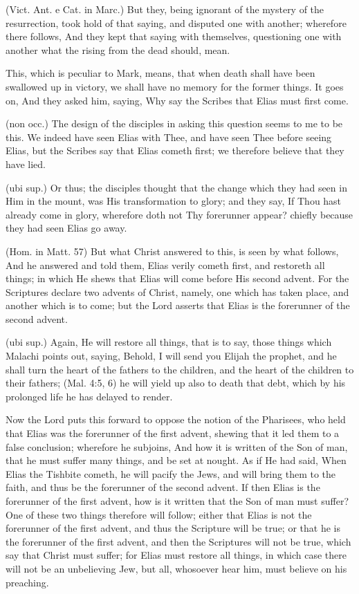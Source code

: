  (Vict. Ant. e Cat. in Marc.) But they, being ignorant of the mystery of the resurrection, took hold of that saying, and disputed one with another; wherefore there follows, And they kept that saying with themselves, questioning one with another what the rising from the dead should, mean.

 This, which is peculiar to Mark, means, that when death shall have been swallowed up in victory, we shall have no memory for the former things. It goes on, And they asked him, saying, Why say the Scribes that Elias must first come.

 (non occ.) The design of the disciples in asking this question seems to me to be this. We indeed have seen Elias with Thee, and have seen Thee before seeing Elias, but the Scribes say that Elias cometh first; we therefore believe that they have lied.

 (ubi sup.) Or thus; the disciples thought that the change which they had seen in Him in the mount, was His transformation to glory; and they say, If Thou hast already come in glory, wherefore doth not Thy forerunner appear? chiefly because they had seen Elias go away.

 (Hom. in Matt. 57) But what Christ answered to this, is seen by what follows, And he answered and told them, Elias verily cometh first, and restoreth all things; in which He shews that Elias will come before His second advent. For the Scriptures declare two advents of Christ, namely, one which has taken place, and another which is to come; but the Lord asserts that Elias is the forerunner of the second advent.

 (ubi sup.) Again, He will restore all things, that is to say, those things which Malachi points out, saying, Behold, I will send you Elijah the prophet, and he shall turn the heart of the fathers to the children, and the heart of the children to their fathers; (Mal. 4:5, 6) he will yield up also to death that debt, which by his prolonged life he has delayed to render.

 Now the Lord puts this forward to oppose the notion of the Pharisees, who held that Elias was the forerunner of the first advent, shewing that it led them to a false conclusion; wherefore he subjoins, And how it is written of the Son of man, that he must suffer many things, and be set at nought. As if He had said, When Elias the Tishbite cometh, he will pacify the Jews, and will bring them to the faith, and thus be the forerunner of the second advent. If then Elias is the forerunner of the first advent, how is it written that the Son of man must suffer? One of these two things therefore will follow; either that Elias is not the forerunner of the first advent, and thus the Scripture will be true; or that he is the forerunner of the first advent, and then the Scriptures will not be true, which say that Christ must suffer; for Elias must restore all things, in which case there will not be an unbelieving Jew, but all, whosoever hear him, must believe on his preaching.

